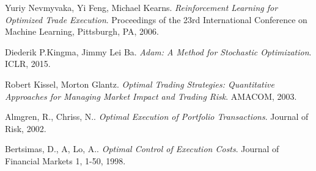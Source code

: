 \documentclass[12pt]{extarticle}
\begin{document}
\newpage
\begin{thebibliography}{9}
Yuriy Nevmyvaka, Yi Feng, Michael Kearns.
\textit{Reinforcement Learning for Optimized Trade Execution}.
Proceedings of the 23rd International Conference on Machine Learning, Pittsburgh, PA, 2006.

Diederik P.Kingma, Jimmy Lei Ba.
\textit{Adam: A Method for Stochastic Optimization}.
ICLR, 2015.

Robert Kissel, Morton Glantz.
\textit{Optimal Trading Strategies: Quantitative Approaches for Managing Market Impact and Trading Risk}.
AMACOM, 2003.

Almgren, R., Chriss, N..
\textit{Optimal Execution of Portfolio Transactions}.
Journal of Risk, 2002.

Bertsimas, D., A, Lo, A..
\textit{Optimal Control of Execution Costs}.
Journal of Financial Markets 1, 1-50, 1998.
\end{thebibliography}
\end{document}

